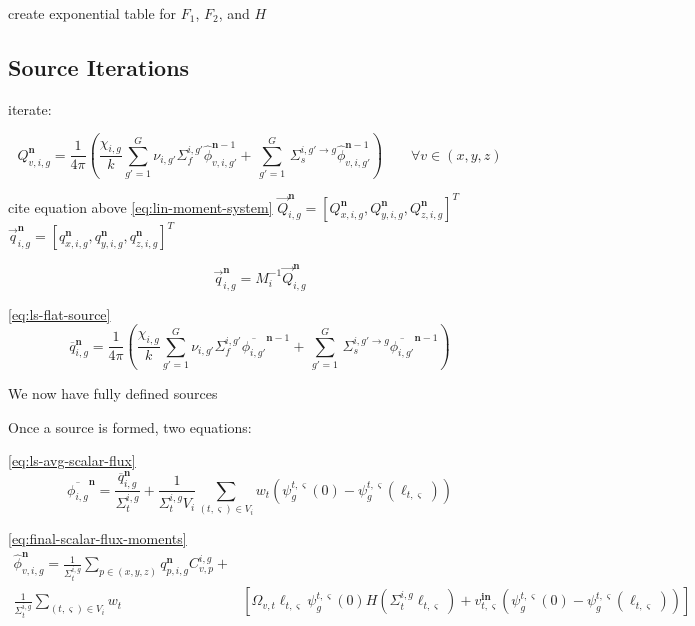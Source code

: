 create exponential table for $F_1$, $F_2$, and $H$

\subsection{Source Iterations}

iterate:

\begin{equation}
Q_{v,i,g}^{\mathbf{n}} = \frac{1}{4 \pi} \left( \frac{\chi_{i,g}}{k} \sum_{g'=1}^{G} \nu_{i,g'} \Sigma_f^{i,g'} \hat{\phi}_{v,i,g'}^{\mathbf{n}-1} + \, \sum_{g'=1}^G \,  \Sigma_{s}^{i,g' \rightarrow g} \hat{\phi}_{v,i,g'}^{\mathbf{n}-1} \right) \qquad \forall v \in (x,y,z)
\end{equation}

cite equation above \ref{eq:lin-moment-system}
$\vec{Q}_{i,g}^{\mathbf{n}} = \left[Q_{x,i,g}^{\mathbf{n}}, Q_{y,i,g}^{\mathbf{n}}, Q_{z,i,g}^{\mathbf{n}}\right]^T$
$\vec{q}_{i,g}^{\mathbf{n}} = \left[q_{x,i,g}^{\mathbf{n}}, q_{y,i,g}^{\mathbf{n}}, q_{z,i,g}^{\mathbf{n}} \right]^T$

\begin{equation}
\vec{q}_{i,g}^{\mathbf{n}} = M_i^{-1} \vec{Q}_{i,g}^{\mathbf{n}}
\end{equation}


\ref{eq:ls-flat-source}
\begin{equation}
\overline{q}_{i,g}^{\mathbf{n}} = \frac{1}{4 \pi} \left( \frac{\chi_{i,g}}{k} \sum_{g'=1}^{G} \nu_{i,g'} \Sigma_f^{i,g'} \overline{\phi_{i,g'}}^{\mathbf{n}-1} + \, \sum_{g'=1}^G \,  \Sigma_{s}^{i,g' \rightarrow g} \overline{\phi_{i,g'}}^{\mathbf{n}-1} \right)
\end{equation}

We now have fully defined sources

Once a source is formed, two equations:

\ref{eq:ls-avg-scalar-flux}
\begin{equation}
\overline{\phi_{i,g}}^{\mathbf{n}} = \frac{\overline{q}_{i,g}^{\mathbf{n}}}{\Sigma_{t}^{i,g}} + \frac{1}{\Sigma_{t}^{i,g} V_i} \sum_{(t,\varsigma) \in V_i} w_t \left(\psi^{t,\varsigma}_g(0) - \psi^{t,\varsigma}_g(\ell_{t,\varsigma}) \right)
\end{equation}

\ref{eq:final-scalar-flux-moments}
\begin{equation*}
\begin{split}
\hat{\phi}_{v,i,g}^{\mathbf{n}} = \frac{1}{\Sigma_{t}^{i,g}} \sum_{p \in (x,y,z)} q_{p,i,g}^{\mathbf{n}} C_{v,p}^{i,g} + & \\
\frac{1}{\Sigma_{t}^{i,g}} \sum_{(t,\varsigma) \in V_i} w_t & \left[\Omega_{v,t} \ell_{t,\varsigma} \psi^{t,\varsigma}_g(0) H(\Sigma_{t}^{i,g} \ell_{t,\varsigma}) + v^{\textbf{in}}_{t,\varsigma} \left(\psi^{t,\varsigma}_g(0) - \psi^{t,\varsigma}_g(\ell_{t,\varsigma}) \right)\right]
\end{split}
\end{equation*}


